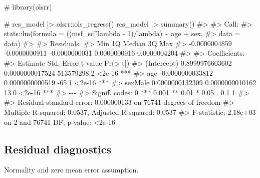 \documentclass[
  12pt,
  a4paper,
  oneside]{tesesusp}
\newenvironment{Shaded}{\begin{snugshade}}{\end{snugshade}}
\newcommand{\CommentTok}[1]{\textcolor[rgb]{0.37,0.37,0.37}{#1}}
\newcommand{\FunctionTok}[1]{\textcolor[rgb]{0.28,0.35,0.67}{#1}}
\newcommand{\NormalTok}[1]{\textcolor[rgb]{0.00,0.23,0.31}{#1}}
\newcommand{\SpecialCharTok}[1]{\textcolor[rgb]{0.37,0.37,0.37}{#1}}
\begin{document}
\begin{Shaded}
\begin{Highlighting}[numbers=left,,]
\CommentTok{\# library(olsrr)}

\CommentTok{\# res\_model |\textgreater{} olsrr::ols\_regress()}
\NormalTok{res\_model }\SpecialCharTok{|\textgreater{}} \FunctionTok{summary}\NormalTok{()}
\CommentTok{\#\textgreater{} }
\CommentTok{\#\textgreater{} Call:}
\CommentTok{\#\textgreater{} stats::lm(formula = ((msf\_sc\^{}lambda {-} 1)/lambda) \textasciitilde{} age + sex, }
\CommentTok{\#\textgreater{}     data = data)}
\CommentTok{\#\textgreater{} }
\CommentTok{\#\textgreater{} Residuals:}
\CommentTok{\#\textgreater{}           Min            1Q        Median            3Q           Max }
\CommentTok{\#\textgreater{} {-}0.0000004859 {-}0.0000000911 {-}0.0000000031  0.0000000916  0.0000004204 }
\CommentTok{\#\textgreater{} }
\CommentTok{\#\textgreater{} Coefficients:}
\CommentTok{\#\textgreater{}                     Estimate       Std. Error     t value Pr(\textgreater{}|t|)    }
\CommentTok{\#\textgreater{} (Intercept)  0.8999976603602  0.0000000017524 513579298.2   \textless{}2e{-}16 ***}
\CommentTok{\#\textgreater{} age         {-}0.0000000033812  0.0000000000519       {-}65.1   \textless{}2e{-}16 ***}
\CommentTok{\#\textgreater{} sexMale      0.0000000132309  0.0000000010162        13.0   \textless{}2e{-}16 ***}
\CommentTok{\#\textgreater{} {-}{-}{-}}
\CommentTok{\#\textgreater{} Signif. codes:  0 \textquotesingle{}***\textquotesingle{} 0.001 \textquotesingle{}**\textquotesingle{} 0.01 \textquotesingle{}*\textquotesingle{} 0.05 \textquotesingle{}.\textquotesingle{} 0.1 \textquotesingle{} \textquotesingle{} 1}
\CommentTok{\#\textgreater{} }
\CommentTok{\#\textgreater{} Residual standard error: 0.000000133 on 76741 degrees of freedom}
\CommentTok{\#\textgreater{} Multiple R{-}squared:  0.0537, Adjusted R{-}squared:  0.0537 }
\CommentTok{\#\textgreater{} F{-}statistic: 2.18e+03 on 2 and 76741 DF,  p{-}value: \textless{}2e{-}16}
\end{Highlighting}
\end{Shaded}

\hypertarget{residual-diagnostics}{%
\subsection{Residual diagnostics}\label{residual-diagnostics}}

Normality and zero mean error assumption.
\end{document}
